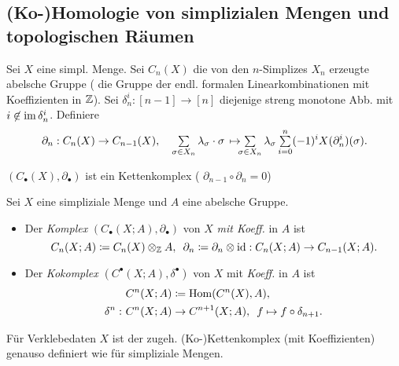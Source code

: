 \documentclass{cheat-sheet}
\newcommand{\nspace}[1]{\foreach \i in {1,...,#1}{ \! }} %
\begin{document}
\begin{samepage}
  \subsection{(Ko-)Homologie von simplizialen Mengen und topologischen Räumen}
\end{samepage}

\begin{defn}
  Sei $X$ eine simpl. Menge. Sei $C_n(X)$ die von den $n$-Simplizes $X_n$ erzeugte abelsche Gruppe (\dh{} die Gruppe der endl. formalen Linearkombinationen mit Koeffizienten in $\mathbb{Z}$). Sei $\delta_n^i : [n{-}1] \to [n]$ diejenige streng monotone Abb. mit $i \not\in \operatorname{im} \delta_n^i$. Definiere
  \[
    \partial_n : C_n(X) \to C_{n-1}(X), \quad
    \sum_{\sigma \in X_n} \lambda_\sigma \cdot \sigma \, \mapsto \nspace{3} \sum_{\sigma \in X_n} \lambda_\sigma \sum_{i=0}^n (-1)^i X(\partial_n^i)(\sigma).
  \]
\end{defn}

\begin{prop}
  $(C_\bullet(X),\partial_\bullet)$ ist ein Kettenkomplex (\dh{} $\partial_{n-1} \circ \partial_n = 0$)
\end{prop}

\begin{defn}
  Sei $X$ eine simpliziale Menge und $A$ eine abelsche Gruppe.
  \begin{itemize}
    \item Der \emph{Komplex} $(C_\bullet(X; A), \partial_\bullet)$ von $X$ \emph{mit Koeff.} in $A$ ist
    \[
      C_n(X; A) \coloneqq C_n(X) \otimes_{\mathbb{Z}} A, \enspace
      \partial_n \coloneqq \partial_n \otimes \operatorname{id} : C_n(X; A) \to C_{n-1}(X; A).
    \]
    \item Der \emph{Kokomplex} $(C^\bullet(X; A), \delta^\bullet)$ von $X$ mit \emph{Koeff.} in $A$ ist
    \begin{align*}
      & C^n(X; A) \coloneqq \operatorname{Hom}(C^n(X), A), \\
      \delta^n : \,\, & C^n(X; A) \to C^{n+1}(X; A), \enspace f \mapsto f \circ \delta_{n+1}.
    \end{align*}
  \end{itemize}
\end{defn}

\begin{defn}
  Für Verklebedaten $X$ ist der zugeh. (Ko-)Kettenkomplex (mit Koeffizienten) genauso definiert wie für simpliziale Mengen.
\end{defn}
\end{document}

